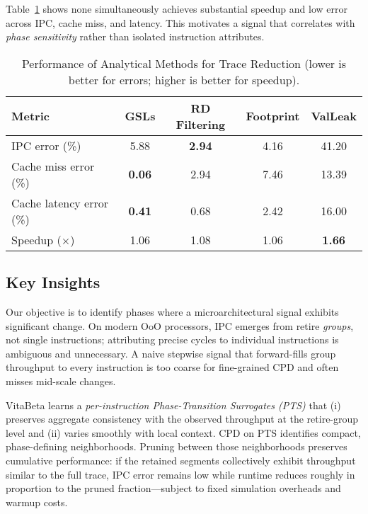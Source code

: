 \documentclass[conference]{IEEEtran}
\begin{document}
Table~\ref{tab:comparison_methods} shows none simultaneously achieves substantial speedup and low error across IPC, cache miss, and latency. This motivates a signal that correlates with \emph{phase sensitivity} rather than isolated instruction attributes.

\begin{table}[htbp!]
\caption{Performance of Analytical Methods for Trace Reduction (lower is better for errors; higher is better for speedup).}
\label{tab:comparison_methods}
\centering
\setlength{\tabcolsep}{4pt}
\begin{adjustbox}{max width=1.09\columnwidth}
\begin{tabular}{l|cccc}
\toprule
Metric & GSLs & RD Filtering & Footprint & ValLeak \\
\midrule
IPC error (\%)             & 5.88 & \textbf{2.94} & 4.16 & 41.20 \\
Cache miss error (\%)      & \textbf{0.06} & 2.94 & 7.46 & 13.39 \\
Cache latency error (\%)   & \textbf{0.41} & 0.68 & 2.42 & 16.00 \\
Speedup ($\times$)         & 1.06 & 1.08 & 1.06 & \textbf{1.66} \\
\bottomrule
\end{tabular}
\end{adjustbox}
\end{table}



\subsection{Key Insights}
\label{sec:intuition}
Our objective is to identify phases where a microarchitectural signal exhibits significant change. On modern OoO processors, IPC emerges from retire \emph{groups}, not single instructions; attributing precise cycles to individual instructions is ambiguous and unnecessary. A naive stepwise signal that forward-fills group throughput to every instruction is too coarse for fine-grained CPD and often misses mid-scale changes.

VitaBeta learns a \emph{per-instruction Phase-Transition Surrogates (PTS)} that (i) preserves aggregate consistency with the observed throughput at the retire-group level and (ii) varies smoothly with local context. CPD on PTS identifies compact, phase-defining neighborhoods. Pruning between those neighborhoods preserves cumulative performance: if the retained segments collectively exhibit throughput similar to the full trace, IPC error remains low while runtime reduces roughly in proportion to the pruned fraction—subject to fixed simulation overheads and warmup costs.
\end{document}

